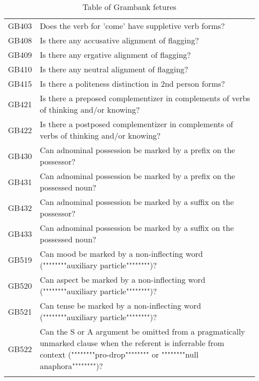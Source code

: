 \begin{longtable}{p{3cm}p{12cm}}
  GB403 & Does the verb for 'come' have suppletive verb forms? \\ 
  GB408 & Is there any accusative alignment of flagging? \\ 
  GB409 & Is there any ergative alignment of flagging? \\ 
  GB410 & Is there any neutral alignment of flagging? \\ 
  GB415 & Is there a politeness distinction in 2nd person forms? \\ 
  GB421 & Is there a preposed complementizer in complements of verbs of thinking and/or knowing? \\ 
  GB422 & Is there a postposed complementizer in complements of verbs of thinking and/or knowing? \\ 
  GB430 & Can adnominal possession be marked by a prefix on the possessor? \\ 
  GB431 & Can adnominal possession be marked by a prefix on the possessed noun? \\ 
  GB432 & Can adnominal possession be marked by a suffix on the possessor? \\ 
  GB433 & Can adnominal possession be marked by a suffix on the possessed noun? \\ 
  GB519 & Can mood be marked by a non-inflecting word (""""""""auxiliary particle"""""""")? \\ 
  GB520 & Can aspect be marked by a non-inflecting word (""""""""auxiliary particle"""""""")? \\ 
  GB521 & Can tense be marked by a non-inflecting word (""""""""auxiliary particle"""""""")? \\ 
  GB522 & Can the S or A argument be omitted from a pragmatically unmarked clause when the referent is inferrable from context (""""""""pro-drop"""""""" or """"""""null anaphora"""""""")? \\ 
   \bottomrule
\caption{Table of Grambank fetures} 
\label{GB_features_table}
\end{longtable}
